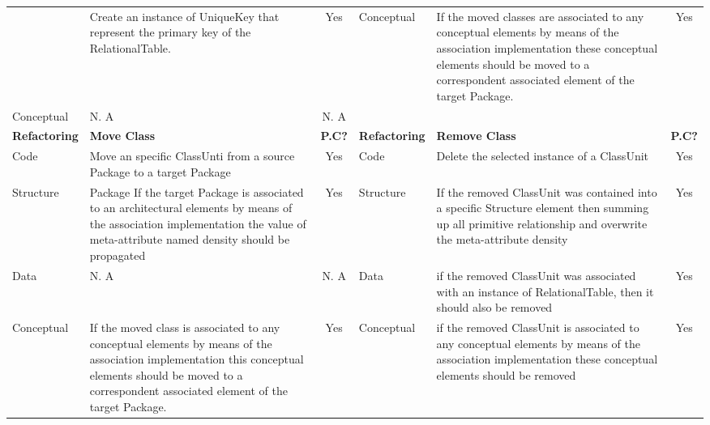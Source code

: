 \begin{table*}
{\begin{tabular}{|l|>{\raggedright}p{7cm}|c|l|>{\raggedright}p{7cm}|c|}
\cline{2-6} 
 & {\footnotesize{Create an instance of UniqueKey that represent the
primary key of the RelationalTable.}} & {\footnotesize{Yes}} & \multirow{2}{*}{{\footnotesize{Conceptual}}} & {\footnotesize{If the moved classes are associated to any conceptual
elements by means of the association implementation these conceptual
elements should be moved to a correspondent associated element of
the target Package.}} & \multirow{2}{*}{{\footnotesize{Yes}}}\tabularnewline
\cline{1-3} 
{\footnotesize{Conceptual}} & {\footnotesize{N. A}} & {\footnotesize{N. A}} &  &  & \tabularnewline
\hline 
\textbf{{\footnotesize{\cellcolor{gray!40}Refactoring}}} & {\textbf{\footnotesize{\cellcolor{gray!40}Move Class}}} & {\textbf{\footnotesize{\cellcolor{gray!40}P.C?}}} & {\textbf{\footnotesize{\cellcolor{gray!40}Refactoring}}} & {\textbf{\footnotesize{\cellcolor{gray!40}Remove Class}}} & {\textbf{\footnotesize{\cellcolor{gray!40}P.C?}}}\tabularnewline
\hline 
{\footnotesize{Code}} & {\footnotesize{Move an specific ClassUnti from a source Package to
a target Package}} & {\footnotesize{Yes}} & {\footnotesize{Code}} & {\footnotesize{Delete the selected instance of a ClassUnit}} & {\footnotesize{Yes}}\tabularnewline
\hline 
{\footnotesize{Structure}} & {\footnotesize{Package If the target Package is associated to an architectural
elements by means of the association implementation the value of meta-attribute
named density should be propagated}} & {\footnotesize{Yes}} & {\footnotesize{Structure}} & {\footnotesize{If the removed ClassUnit was contained into a specific
Structure element then summing up all primitive relationship and overwrite
the meta-attribute density}} & {\footnotesize{Yes}}\tabularnewline
\hline 
{\footnotesize{Data}} & {\footnotesize{N. A}} & {\footnotesize{N. A}} & {\footnotesize{Data}} & {\footnotesize{if the removed ClassUnit was associated with an instance
of RelationalTable, then it should also be removed}} & {\footnotesize{Yes}}\tabularnewline
\hline 
{\footnotesize{Conceptual}} & {\footnotesize{If the moved class is associated to any conceptual
elements by means of the association implementation this conceptual
elements should be moved to a correspondent associated element of
the target Package.}} & {\footnotesize{Yes}} & {\footnotesize{Conceptual}} & {\footnotesize{if the removed ClassUnit is associated to any conceptual
elements by means of the association implementation these conceptual
elements should be removed}} & {\footnotesize{Yes}}\tabularnewline
\hline 
\end{tabular}}
\end{table*}


